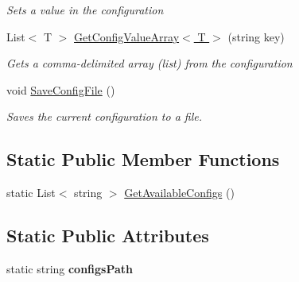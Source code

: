 \begin{DoxyCompactItemize}
\begin{DoxyCompactList}\small\item\em Sets a value in the configuration\end{DoxyCompactList}\item 
List$<$ T $>$ \hyperlink{class_m_b_c_1_1_core_1_1_configuration_af882c0ae8a328ac8288d11fe85ec2bf4}{Get\-Config\-Value\-Array$<$ T $>$} (string key)
\begin{DoxyCompactList}\small\item\em Gets a comma-\/delimited array (list) from the configuration\end{DoxyCompactList}\item 
void \hyperlink{class_m_b_c_1_1_core_1_1_configuration_a04f21c72d510c6486acfc8c27fdc34ce}{Save\-Config\-File} ()
\begin{DoxyCompactList}\small\item\em Saves the current configuration to a file.\end{DoxyCompactList}\end{DoxyCompactItemize}
\subsection*{Static Public Member Functions}
\begin{DoxyCompactItemize}
\item 
static List$<$ string $>$ \hyperlink{class_m_b_c_1_1_core_1_1_configuration_a6b5833220d539c7b7e48863659bd1cde}{Get\-Available\-Configs} ()
\end{DoxyCompactItemize}
\subsection*{Static Public Attributes}
\begin{DoxyCompactItemize}
\item 
\hypertarget{class_m_b_c_1_1_core_1_1_configuration_a1c7eed020dd757dde8d5cc72f6096f30}{static string {\bfseries configs\-Path}}\label{class_m_b_c_1_1_core_1_1_configuration_a1c7eed020dd757dde8d5cc72f6096f30}

\end{DoxyCompactItemize}
